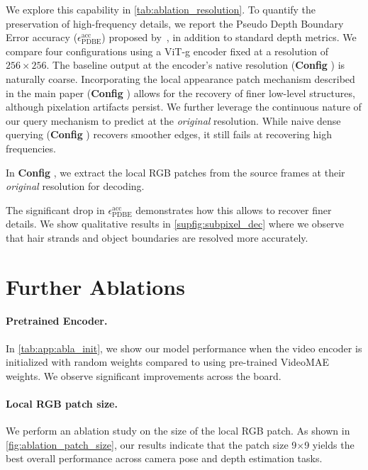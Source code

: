 We explore this capability in \cref{tab:ablation_resolution}.
To quantify the preservation of high-frequency details, we report the Pseudo Depth Boundary Error accuracy ($\epsilon^{\text{acc}}_{\text{PDBE}}$) proposed by~\citet{pham2025sharpdepth}, in addition to standard depth metrics. We compare four configurations using a ViT-g encoder fixed at a resolution of $256{\times}256$.
The baseline output at the encoder's native resolution (\textbf{Config }) is naturally coarse. Incorporating the local appearance patch mechanism described in the main paper (\textbf{Config }) allows for the recovery of finer low-level structures, although pixelation artifacts persist.
We further leverage the continuous nature of our query mechanism to predict at the \textit{original} resolution.
While naive dense querying (\textbf{Config }) recovers smoother edges, it still fails at recovering high frequencies.

In \textbf{Config }, we extract the local RGB patches from the source frames at their \textit{original} resolution for decoding.

The significant drop in $\epsilon^{\text{acc}}_{\text{PDBE}}$ demonstrates how this allows \name to recover finer details.
We show qualitative results in \cref{supfig:subpixel_dec} where we observe that hair strands and object boundaries are resolved more accurately.






\section{Further Ablations}


\paragraph{Pretrained Encoder.}
In \cref{tab:app:abla_init}, we show our model performance when the video encoder is initialized with random weights compared to using pre-trained VideoMAE~\cite{videomaev2} weights.
We observe significant improvements across the board.



\paragraph{Local RGB patch size.}
We perform an ablation study on the size of the local RGB patch.
As shown in \cref{fig:ablation_patch_size}, our results indicate that the patch size 9$\times$9 yields the best overall performance across camera pose and depth estimation tasks.

